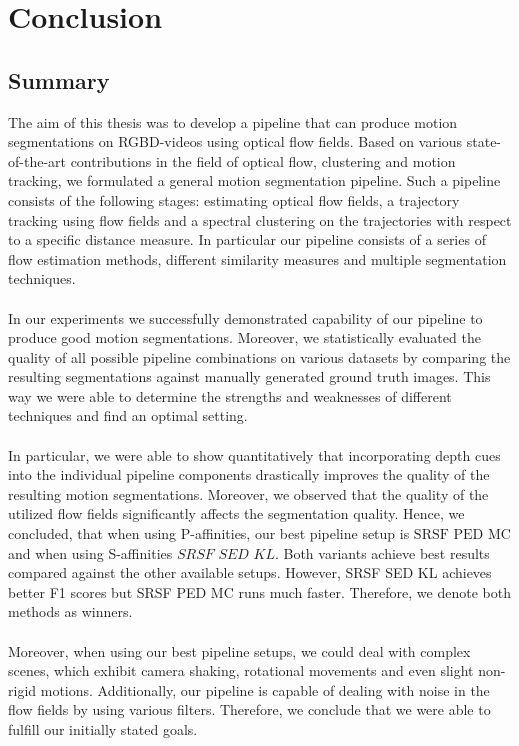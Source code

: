 \chapter{Conclusion}
\section{Summary}
The aim of this thesis was to develop a pipeline that can produce motion segmentations on RGBD-videos using optical flow fields. Based on various state-of-the-art contributions in the field of optical flow, clustering and motion tracking, we formulated a general motion segmentation pipeline. Such a pipeline consists of the following stages: estimating optical flow fields, a trajectory tracking using flow fields and a spectral clustering on the trajectories with respect to a specific distance measure. In particular our pipeline consists of a series of flow estimation methods, different similarity measures and multiple segmentation techniques. \\ \\ 
In our experiments we successfully demonstrated capability of our pipeline to produce good motion segmentations. Moreover, we statistically evaluated the quality of all possible pipeline combinations on various datasets by comparing the resulting segmentations against manually generated ground truth images. This way we were able to determine the strengths and weaknesses of different techniques and find an optimal setting. \\ \\
In particular, we were able to show quantitatively that incorporating depth cues into the individual pipeline components drastically improves the quality of the resulting motion segmentations. Moreover, we observed that the quality of the utilized flow fields significantly affects the segmentation quality. Hence, we concluded, that when using P-affinities, our best pipeline setup is $\text{SRSF PED MC}$ and when using S-affinities $\textit{SRSF SED KL}$. Both variants achieve best results compared against the other available setups. However, SRSF SED KL achieves better F1 scores but SRSF PED MC runs much faster. Therefore, we denote both methods as winners.  \\ \\
Moreover, when using our best pipeline setups, we could deal with complex scenes, which exhibit camera shaking, rotational movements and even slight non-rigid motions. Additionally, our pipeline is capable of dealing with noise in the flow fields by using various filters. Therefore, we conclude that we were able to fulfill our initially stated goals. \\ \\
